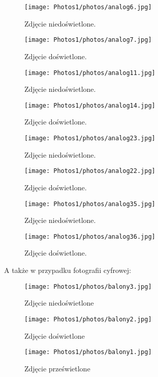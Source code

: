 \documentclass[]{mwart}
\begin{document}
\begin{figure}[H]
    \centering
    \texttt{[image: Photos1/photos/analog6.jpg]}
    \caption{Zdjęcie niedoświetlone.}
\end{figure}
\begin{figure}[H]
    \centering
    \texttt{[image: Photos1/photos/analog7.jpg]}
    \caption{Zdjęcie doświetlone.}
\end{figure}



\begin{figure}[H]
    \centering
    \texttt{[image: Photos1/photos/analog11.jpg]}
    \caption{Zdjęcie niedoświetlone.}
\end{figure}
\begin{figure}[H]
    \centering
    \texttt{[image: Photos1/photos/analog14.jpg]}
    \caption{Zdjęcie doświetlone.}
\end{figure}



\begin{figure}[H]
    \centering
    \texttt{[image: Photos1/photos/analog23.jpg]}
    \caption{Zdjęcie niedoświetlone.}
\end{figure}
\begin{figure}[H]
    \centering
    \texttt{[image: Photos1/photos/analog22.jpg]}
    \caption{Zdjęcie doświetlone.}
\end{figure}


\begin{figure}[H]
    \centering
    \texttt{[image: Photos1/photos/analog35.jpg]}
    \caption{Zdjęcie niedoświetlone.}
\end{figure}
\begin{figure}[H]
    \centering
    \texttt{[image: Photos1/photos/analog36.jpg]}
    \caption{Zdjęcie doświetlone.}
\end{figure}


\newpage
A także w przypadku fotografii cyfrowej:

\begin{figure}[H]
    \centering
    \texttt{[image: Photos1/photos/balony3.jpg]}
    \caption{Zdjęcie niedoświetlone}
\end{figure}
\begin{figure}[H]
    \centering
    \texttt{[image: Photos1/photos/balony2.jpg]}
    \caption{Zdjęcie doświetlone}
\end{figure}
\begin{figure}[H]
    \centering
    \texttt{[image: Photos1/photos/balony1.jpg]}
    \caption{Zdjęcie prześwietlone}
\end{figure}
\end{document}
